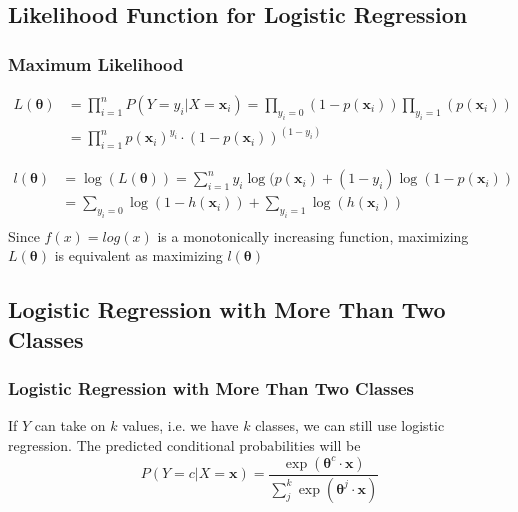 \documentclass{beamer}
\begin{document}
\subsection{Likelihood Function for Logistic Regression}
\begin{frame}
\frametitle{Maximum Likelihood}

\begin{equation}
\begin{aligned}
L(\bm{\theta}) &= \prod_{i=1}^n P(Y = y_{i}  | X = \mathbf{x}_{i}) = \prod_{y_{i} = 0 } (1-p(\mathbf{x}_{i})) \prod_{y_{i} = 1 } (p(\mathbf{x}_{i})) \\
&= \prod_{i=1}^{n} p(\mathbf{x}_{i})^{y_{i}} \cdot (1-p(\mathbf{x}_{i}))^{(1-{y_{i}})}
\end{aligned}
\end{equation}

\begin{equation}
\begin{aligned}
l (\bm{\theta}) &=  \log (L(\bm{\theta}) ) = \sum_{i=1}^{n} y_{i} \log(p(\mathbf{x}_{i}) + (1-y_{i}) \log(1-p(\mathbf{x}_{i})) \\
&= \sum_{y_{i} = 0 } \log (1-h(\mathbf{x}_{i})) + \sum_{y_{i} = 1} \log (h(\mathbf{x}_{i})) \\
\end{aligned}
\end{equation}
Since $f(x) = log(x)$ is a monotonically increasing function, maximizing $L(\bm{\theta})$ is equivalent as maximizing $l(\bm{\theta})$
\end{frame}
%
%
%
\subsection{Logistic Regression with More Than Two Classes}
\begin{frame}
\frametitle{Logistic Regression with More Than Two Classes}
If $Y$ can take on $k$ values, i.e. we have $k$ classes, we can still use logistic regression. The predicted conditional probabilities will be
\begin{equation}
P(Y = c | X = \mathbf{x}) = \frac{\exp ({\bm{\theta}^{c} \cdot \mathbf{x} })}{ \sum_{j}^{k} \exp(\bm{\theta}^{j} \cdot \mathbf{x}) }
\end{equation}
\end{frame}
\end{document}
